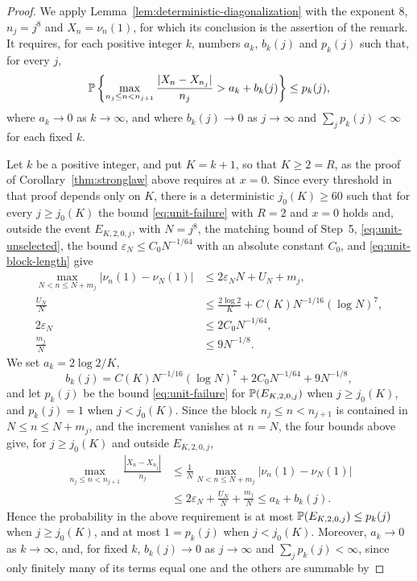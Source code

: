 \begin{proof}
We apply Lemma~\ref{lem:deterministic-diagonalization} with the exponent
$8$, $n_j=j^8$ and $X_n=\nu_n(1)$, for which its conclusion is the
assertion of the remark. It requires, for each positive integer $k$,
numbers $a_k$, $b_k(j)$ and $p_k(j)$ such that, for every $j$,
\[
 \mathbb P\left\{\max_{n_j\le n<n_{j+1}}\frac{|X_n-X_{n_j}|}{n_j}
 >a_k+b_k(j)\right\}\le p_k(j),
\]
where $a_k\to0$ as $k\to\infty$, and where $b_k(j)\to0$ as $j\to\infty$
and $\sum_jp_k(j)<\infty$ for each fixed $k$.

Let $k$ be a positive integer, and put $K=k+1$, so that $K\ge2=R$, as the
proof of Corollary~\ref{thm:stronglaw} above requires at $x=0$. Since every
threshold in that proof depends only on $K$, there is a deterministic
$j_0(K)\ge60$ such that for every $j\ge j_0(K)$ the bound
\eqref{eq:unit-failure} with $R=2$ and $x=0$ holds and, outside the event
$E_{K,2,0,j}$, with $N=j^8$, the matching bound of Step~5,
\eqref{eq:unit-unselected}, the bound $\varepsilon_N\le C_0N^{-1/64}$ with
an absolute constant $C_0$, and \eqref{eq:unit-block-length} give
\begin{align*}
 \max_{N<n\le N+m_j}|\nu_n(1)-\nu_N(1)|&\le2\varepsilon_NN+U_N+m_j,\\
 \frac{U_N}N&\le\frac{2\log2}K+C(K)N^{-1/16}(\log N)^7,\\
 2\varepsilon_N&\le2C_0N^{-1/64},\\
 \frac{m_j}N&\le9N^{-1/8}.
\end{align*}
We set $a_k=2\log2/K$,
\[
 b_k(j)=C(K)N^{-1/16}(\log N)^7+2C_0N^{-1/64}+9N^{-1/8},
\]
and let $p_k(j)$ be the bound \eqref{eq:unit-failure} for
$\mathbb P(E_{K,2,0,j})$ when $j\ge j_0(K)$, and $p_k(j)=1$ when
$j<j_0(K)$.
Since the block $n_j\le n<n_{j+1}$ is contained in $N\le n\le N+m_j$,
and the increment vanishes at $n=N$, the four bounds above give, for
$j\ge j_0(K)$ and outside $E_{K,2,0,j}$,
\begin{align*}
 \max_{n_j\le n<n_{j+1}}\frac{|X_n-X_{n_j}|}{n_j}
 &\le\frac1N\max_{N<n\le N+m_j}|\nu_n(1)-\nu_N(1)|\\
 &\le2\varepsilon_N+\frac{U_N}N+\frac{m_j}N
 \le a_k+b_k(j).
\end{align*}
Hence the probability in the above requirement is at most
$\mathbb P(E_{K,2,0,j})\le p_k(j)$ when $j\ge j_0(K)$, and at most $1=p_k(j)$
when $j<j_0(K)$. Moreover, $a_k\to0$ as $k\to\infty$, and, for fixed
$k$, $b_k(j)\to0$ as $j\to\infty$ and $\sum_jp_k(j)<\infty$, since only
finitely many of its terms equal one and the others are summable by

\end{proof}
